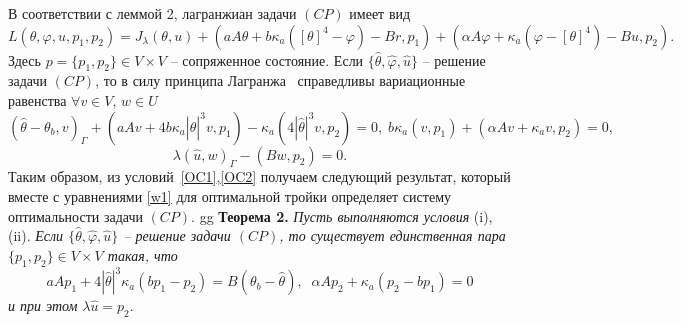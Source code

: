    В соответствии с леммой 2, лагранжиан задачи $(CP)$ имеет вид
    \[
        L(\theta, \varphi, u, p_1, p_2) = J_\lambda(\theta, u)
        + (aA\theta + b\kappa_a([\theta]^4 - \varphi) - Br, p_1)
        + (\alpha A \varphi + \kappa_a(\varphi - [\theta]^4) - Bu, p_2).
    \]
    Здесь $p=\{p_1,p_2\}\in V\times V$ -- сопряженное состояние.
    Если $\{\hat{\theta}, \hat{\varphi}, \hat{u} \}$ -- решение задачи $(CP)$, то
    в силу принципа Лагранжа~\cite[Теорема 1.5]{10} справедливы вариационные равенства
    $\forall v\in V,\, w\in U$
    \begin{equation}
        \label{OC1}
        (\hat{\theta} -\theta_b, v)_\Gamma + (aAv + 4 b\kappa_a |\hat{\theta}|^3v, p_1)
        - \kappa_a ( 4 |\hat{\theta}|^3v, p_2) = 0,\;
        b \kappa_a (v, p_1)+ (\alpha A v + \kappa_a v, p_2) = 0,
    \end{equation}
    \begin{equation}
        \label{OC2}
        \lambda(\hat{u},w)_\Gamma - (Bw, p_2) = 0.
    \end{equation}
    Таким образом, из условий~\eqref{OC1},\eqref{OC2}
    получаем следующий результат, который вместе с уравнениями \eqref{w1}
    для оптимальной тройки определяет систему оптимальности задачи $(CP)$.
gg
    \textbf{Теорема 2.}
    \textit{Пусть выполняются условия} (i),(ii).
        \textit{Если $\{\hat{\theta}, \hat{\varphi}, \hat{u}\}$ -- решение
    задачи $(CP)$, то существует единственная пара $\{p_1, p_2 \} \in V\times V$
        такая, что}
    \begin{equation}
        \label{AS}
        aAp_1 +4|\hat{\theta}|^3 \kappa_a(bp_1 - p_2) = B(\theta_b - \hat{\theta}), \;\;
        \alpha A p_2 + \kappa_a (p_2 - b p_1)=0
    \end{equation}
    \textit{и при этом} $\lambda\hat{u} = p_2.$




